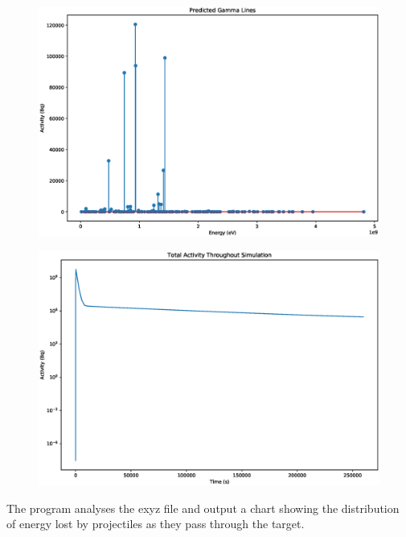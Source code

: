 \documentclass[12pt,twoside]{manual}
\begin{document}
\FloatBarrier
\begin{figure}[h]
  \begin{center}
    \includegraphics[scale=0.4]{img/end_of_sim_gamma_lines.eps}
  \end{center}
\end{figure}

\FloatBarrier
\begin{figure}[h]
  \begin{center}
    \includegraphics[scale=0.4]{img/total_sim_total_activity_log.eps}
  \end{center}
\end{figure}


\FloatBarrier

The program analyses the exyz file and output a chart showing the distribution of energy lost by projectiles as they pass through the target.  
\end{document}
